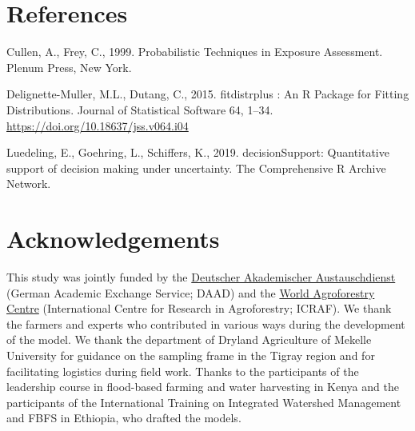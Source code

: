 \documentclass[]{elsarticle} %
\begin{document}
\hypertarget{references}{%
\section*{References}\label{references}}

\hypertarget{refs}{}
\leavevmode\hypertarget{ref-Cullen_and_Frey_1999}{}%
Cullen, A., Frey, C., 1999. Probabilistic Techniques in Exposure Assessment. Plenum Press, New York.

\leavevmode\hypertarget{ref-Delignette-Muller_and_Dutang_2015}{}%
Delignette-Muller, M.L., Dutang, C., 2015. fitdistrplus : An R Package for Fitting Distributions. Journal of Statistical Software 64, 1--34. \url{https://doi.org/10.18637/jss.v064.i04}

\leavevmode\hypertarget{ref-Luedeling_Goehring_et_al_2019}{}%
Luedeling, E., Goehring, L., Schiffers, K., 2019. decisionSupport: Quantitative support of decision making under uncertainty. The Comprehensive R Archive Network.

\hypertarget{acknowledgements}{%
\section*{Acknowledgements}\label{acknowledgements}}

This study was jointly funded by the \href{https://www.daad.de/en/}{Deutscher Akademischer Austauschdienst} (German Academic Exchange Service; DAAD) and the \href{http://www.worldagroforestry.org/}{World Agroforestry Centre} (International Centre for Research in Agroforestry; ICRAF). We thank the farmers and experts who contributed in various ways during the development of the model. We thank the department of Dryland Agriculture of Mekelle University for guidance on the sampling frame in the Tigray region and for facilitating logistics during field work. Thanks to the participants of the leadership course in flood-based farming and water harvesting in Kenya and the participants of the International Training on Integrated Watershed Management and FBFS in Ethiopia, who drafted the models.
\end{document}
